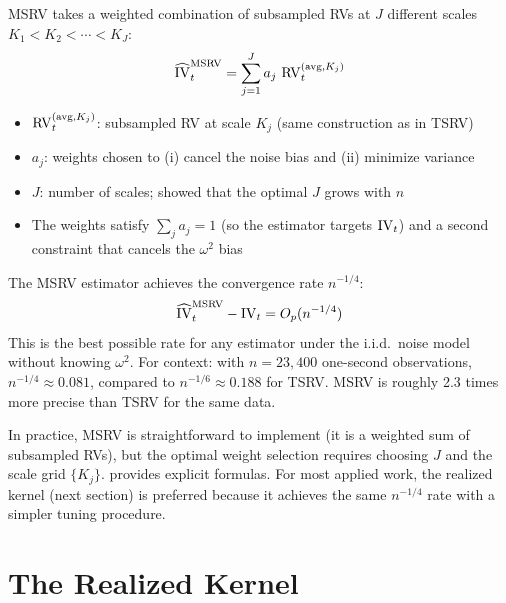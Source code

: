 \begin{definition}
MSRV takes a weighted combination of subsampled RVs at $J$ different scales $K_1 < K_2 < \cdots < K_J$:
\begin{equation}
  \widehat{\operatorname{IV}}_t^{\text{MSRV}} = \sum_{j=1}^{J} a_j \, \operatorname{RV}^{(\text{avg}, K_j)}_t
  \label{eq:msrv}
\end{equation}
\begin{itemize}[nosep]
  \item $\operatorname{RV}^{(\text{avg}, K_j)}_t$: subsampled RV at scale $K_j$ (same construction as in TSRV)
  \item $a_j$: weights chosen to (i) cancel the noise bias and (ii) minimize variance
  \item $J$: number of scales; \citet{Zhang2006} showed that the optimal $J$ grows with $n$
  \item The weights satisfy $\sum_j a_j = 1$ (so the estimator targets $\operatorname{IV}_t$) and a second constraint that cancels the $\omega^2$ bias
\end{itemize}
\end{definition}

\begin{keyresult}
The MSRV estimator achieves the convergence rate $n^{-1/4}$:
\[
  \widehat{\operatorname{IV}}_t^{\text{MSRV}} - \operatorname{IV}_t = O_p(n^{-1/4})
\]
This is the best possible rate for any estimator under the i.i.d.\ noise model without knowing $\omega^2$.
For context: with $n = 23{,}400$ one-second observations, $n^{-1/4} \approx 0.081$, compared to $n^{-1/6} \approx 0.188$ for TSRV.
MSRV is roughly 2.3 times more precise than TSRV for the same data.
\end{keyresult}

In practice, MSRV is straightforward to implement (it is a weighted sum of subsampled RVs), but the optimal weight selection requires choosing $J$ and the scale grid $\{K_j\}$.
\citet{Zhang2006} provides explicit formulas.
For most applied work, the realized kernel (next section) is preferred because it achieves the same $n^{-1/4}$ rate with a simpler tuning procedure.


\section{The Realized Kernel}
\label{sec:realized-kernel}

